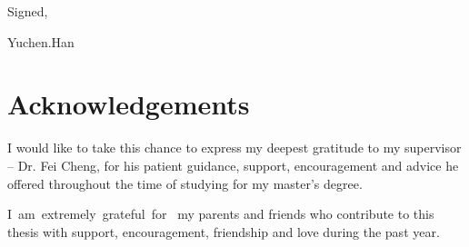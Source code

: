 \documentclass[a4paper,10pt,oneside]{book}
\begin{document}
Signed,

Yuchen.Han


\chapter{Acknowledgements}


I would like to take this chance to express my deepest gratitude to my supervisor – Dr. Fei Cheng, for his patient guidance, support, encouragement and advice he offered throughout the time of studying for my master’s degree.

I am extremely grateful for  my parents and friends who contribute to this thesis with support, encouragement, friendship and love during the past year.



\setlength{\parskip}{0pt} 


\tableofcontents



\listoftables

\listoffigures


\setlength{\parskip}{10pt} 


\mainmatter





\singlespacing








\end{document}
